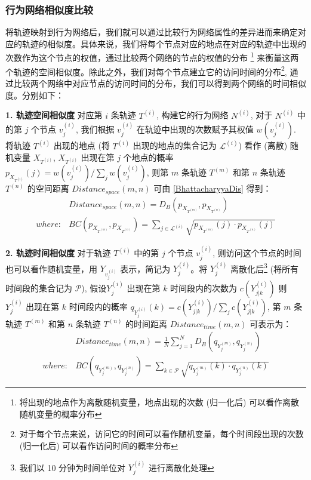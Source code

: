 \subsubsection{行为网络相似度比较}
\label{subsubsec:computesimilarity}
将轨迹映射到行为网络后，我们就可以通过比较行为网络属性的差异进而来确定对应的轨迹的相似度。具体来说，我们将每个节点对应的地点在对应的轨迹中出现的次数作为这个节点的权值，通过比较两个网络的节点的权值的分布 \footnote{将出现的地点作为离散随机变量，地点出现的次数 (归一化后) 可以看作离散随机变量的概率分布} 来衡量这两个轨迹的空间相似度。除此之外，我们对每个节点建立它的访问时间的分布\footnote{对于每个节点来说，访问它的时间可以看作随机变量，每个时间段出现的次数 (归一化后) 可以看作访问时间的概率分布}, 通过比较两个网络中对应节点的访问时间的分布，我们可以得到两个网络的时间相似度。分别如下：\par
\vspace{1mm}
\textbf{1. 轨迹空间相似度} 对应第 $i$ 条轨迹 $T^{(i)}$, 构建它的行为网络 $N^{(i)}$, 对于 $N^{(i)}$ 中的第 $j$ 个节点 $v^{(i)}_j$, 我们根据 $v^{(i)}_j$ 在轨迹中出现的次数赋予其权值 $w(v^{(i)}_j)$. 将轨迹 $T^{(i)}$ 出现的地点 (将 $T^{(i)}$ 出现的地点的集合记为 $\mathcal{L}^{(i)}$) 看作 (离散) 随机变量 $X_{T^{(i)}}$, $X_{T^{(i)}}$ 出现在第 $j$ 个地点的概率 $p_{X_{T^{(i)}}}(j) = {w(v^{(i)}_j)}/{\sum_j {w(v^{(i)}_j)}}$, 则第 $m$ 条轨迹 $T^{(m)}$ 和第 $n$ 条轨迹 $T^{(n)}$ 的空间距离 $Distance_{space}(m,n)$ 可由 \ref{BhattacharyyaDis} 得到：
\vspace{1.5mm}
\begin{equation}
\label{SpaceSimilarity}
\begin{split}
&Distance_{space}(m,n) = D_B(p_{X_{T^{(m)}}},p_{X_{T^{(n)}}}) \\ 
where: & BC(p_{X_{T^{(m)}}},p_{X_{T^{(n)}}}) = \sum_{j \in \mathcal{L}^{(i)}} \sqrt{p_{X_{T^{(m)}}}(j) \cdot p_{X_{T^{(n)}}} (j)}
\end{split}
\end{equation}

\vspace{2.5mm}
\textbf{2. 轨迹时间相似度} 对于轨迹 $T^{(i)}$ 中的第 $j$ 个节点 $v^{(i)}_j$, 则访问这个节点的时间也可以看作随机变量，用 $Y_{v^{(i)}_j}$ 表示，简记为 $Y^{(i)}_{j}$。将 $Y^{(i)}_{j}$ 离散化后\footnote{我们以 10 分钟为时间单位对 $Y^{(i)}_{j}$ 进行离散化处理} (将所有时间段的集合记为 $\mathcal{P}$), 假设$Y^{(i)}_{j}$ 出现在第 $k$ 时间段内的次数为 $c (Y^{(i)}_{j|k})$ 则 $Y^{(i)}_{j}$ 出现在第 $k$ 时间段内的概率 $q_{Y^{(i)}_{j}}(k) = c(Y^{(i)}_{j|k}) / \sum_j c(Y^{(i)}_{j|k})$, 第 $m$ 条轨迹 $T^{(m)}$ 和第 $n$ 条轨迹 $T^{(n)}$ 的时间距离 $Distance_{time}(m,n)$ 可表示为：
\vspace{1mm}
\begin{equation}
\label{TimeSimilarity}
\begin{split}
&Distance_{time}(m,n) = \frac{1}{N} \sum_{j=1}^N D_B(q_{Y^{(m)}_{j}},q_{Y^{(n)}_{j}}) \\
where: & BC(q_{Y^{(m)}_{j}},q_{Y^{(n)}_{j}}) = \sum_{k \in \mathcal{P}} \sqrt{q_{Y^{(m)}_{j}} (k) \cdot q_{Y^{(n)}_{j}} (k)}
\end{split}
\end{equation}


